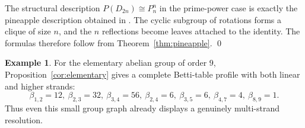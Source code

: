 \documentclass[12pt]{article}
\renewenvironment{proof}{{\bf \noindent Proof.}}{\qed}
\theoremstyle{definition}
\newtheorem{example}[theorem]{Example}
\theoremstyle{remark}
\begin{document}
	\begin{proof}
		The structural description $P(D_{2n})\cong P_n^n$ in the prime-power case is exactly the pineapple description obtained in \cite{Rather2024}. The cyclic subgroup of rotations forms a clique of size $n$, and the $n$ reflections become leaves attached to the identity. The formulas therefore follow from Theorem~\ref{thm:pineapple}.
	\end{proof}
	
	
	
	
	\begin{example}\label{ex:group-example}
		For the elementary abelian group of order $9$, Proposition~\ref{cor:elementary} gives a complete Betti-table profile with both linear and higher strands:
		$$
		\beta_{1,2}=12,\ \beta_{2,3}=32,\ \beta_{3,4}=56,\ \beta_{2,4}=6,\ \beta_{3,5}=6,\ \beta_{4,7}=4,\ \beta_{8,9}=1.
		$$
		Thus even this small group graph already displays a genuinely multi-strand resolution.
	\end{example}
	
\end{document}
